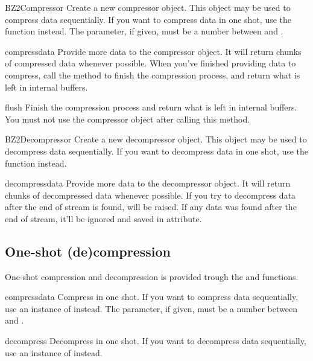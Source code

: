 \begin{classdesc}{BZ2Compressor}{}
Create a new compressor object. This object may be used to compress
data sequentially. If you want to compress data in one shot, use the
 function instead. The  parameter,
if given, must be a number between  and .
\end{classdesc}

\begin{methoddesc}[BZ2Compressor]{compress}{data}
Provide more data to the compressor object. It will return chunks of compressed
data whenever possible. When you've finished providing data to compress, call
the  method to finish the compression process, and return what
is left in internal buffers.
\end{methoddesc}

\begin{methoddesc}[BZ2Compressor]{flush}{}
Finish the compression process and return what is left in internal buffers. You
must not use the compressor object after calling this method.
\end{methoddesc}

\begin{classdesc}{BZ2Decompressor}{}
Create a new decompressor object. This object may be used to decompress
data sequentially. If you want to decompress data in one shot, use the
 function instead.
\end{classdesc}

\begin{methoddesc}[BZ2Decompressor]{decompress}{data}
Provide more data to the decompressor object. It will return chunks of
decompressed data whenever possible. If you try to decompress data after the
end of stream is found,  will be raised. If any data was
found after the end of stream, it'll be ignored and saved in
 attribute.
\end{methoddesc}


\subsection{One-shot (de)compression}

One-shot compression and decompression is provided trough the
 and  functions.

\begin{funcdesc}{compress}{data}
Compress  in one shot. If you want to compress data sequentially,
use an instance of  instead. The 
parameter, if given, must be a number between  and .
\end{funcdesc}

\begin{funcdesc}{decompress}{}
Decompress  in one shot. If you want to decompress data
sequentially, use an instance of  instead.
\end{funcdesc}

